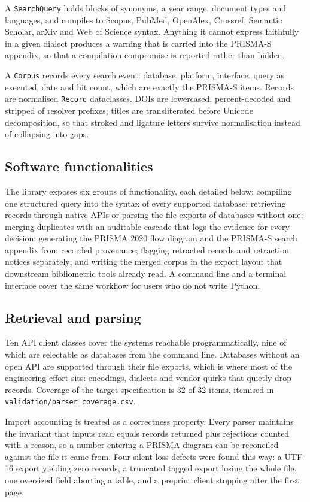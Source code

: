 \documentclass[final,5p,times,twocolumn]{elsarticle}
\begin{document}
A \texttt{SearchQuery} holds blocks of synonyms, a year range, document types
and languages, and compiles to Scopus, PubMed, OpenAlex, Crossref, Semantic
Scholar, arXiv and Web of Science syntax. Anything it cannot express
faithfully in a given dialect produces a warning that is carried into the
PRISMA-S appendix, so that a compilation compromise is reported rather than
hidden.

A \texttt{Corpus} records every search event: database, platform, interface,
query as executed, date and hit count, which are exactly the PRISMA-S items.
Records are normalised \texttt{Record} dataclasses. DOIs are lowercased,
percent-decoded and stripped of resolver prefixes; titles are transliterated
before Unicode decomposition, so that stroked and ligature letters survive
normalisation instead of collapsing into gaps.

\subsection{Software functionalities}

The library exposes six groups of functionality, each detailed below: compiling
one structured query into the syntax of every supported database; retrieving
records through native APIs or parsing the file exports of databases without
one; merging duplicates with an auditable cascade that logs the evidence for
every decision; generating the PRISMA 2020 flow diagram and the PRISMA-S search
appendix from recorded provenance; flagging retracted records and retraction
notices separately; and writing the merged corpus in the export layout that
downstream bibliometric tools already read. A command line and a terminal
interface cover the same workflow for users who do not write Python.

\subsection{Retrieval and parsing}

Ten API client classes cover the systems reachable programmatically, nine of
which are selectable as databases from the command line. Databases without an
open API are supported through their file exports, which is where most of the
engineering effort sits: encodings, dialects and vendor quirks that quietly
drop records. Coverage of the target specification is 32 of 32 items, itemised
in \texttt{validation/parser\_coverage.csv}.

Import accounting is treated as a correctness property. Every parser maintains
the invariant that inputs read equals records returned plus rejections counted
with a reason, so a number entering a PRISMA diagram can be reconciled against
the file it came from. Four silent-loss defects were found this way: a UTF-16
export yielding zero records, a truncated tagged export losing the whole file,
one oversized field aborting a table, and a preprint client stopping after the
first page.
\end{document}
